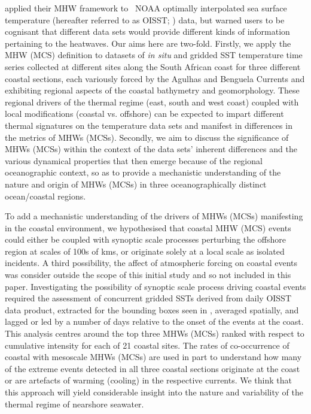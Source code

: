 \documentclass[a4paper,10pt,review]{elsarticle}
\begin{document}
\citet{Hobday2016} applied their MHW framework to \degree~NOAA optimally interpolated sea surface temperature (hereafter referred to as OISST; \cite{Reynolds2007}) data, but warned users to be cognisant that different data sets would provide different kinds of information pertaining to the heatwaves. Our aims here are two-fold. Firstly, we apply the MHW (MCS) definition to datasets of \emph{in situ} and gridded SST temperature time series collected at different sites along the South African coast for three different coastal sections, each variously forced by the Agulhas and Benguela Currents and exhibiting regional aspects of the coastal bathymetry and geomorphology. These regional drivers of the thermal regime (east, south and west coast) coupled with local modifications (coastal vs. offshore) can be expected to impart different thermal signatures on the temperature data sets and manifest in differences in the metrics of MHWs (MCSs). Secondly, we aim to discuss the significance of MHWs (MCSs) within the context of the data sets’ inherent differences and the various dynamical properties that then emerge because of the regional oceanographic context, so as to provide a mechanistic understanding of the nature and origin of MHWs (MCSs) in three oceanographically distinct ocean/coastal regions.

To add a mechanistic understanding of the drivers of MHWs (MCSs) manifesting in the coastal environment, we hypothesised that coastal MHW (MCS) events could either be coupled with synoptic scale processes perturbing the offshore region at scales of 100s of kms, or originate solely at a local scale as isolated incidents. A third possibility, the affect of atmospheric forcing on coastal events was consider outside the scope of this initial study and so not included in this paper. Investigating the possibility of synoptic scale process driving coastal events required the assessment of concurrent gridded SSTs derived from daily OISST data product, extracted for the bounding boxes seen in , averaged spatially, and lagged or led by a number of days relative to the onset of the events at the coast. This analysis centres around the top three MHWs (MCSs) ranked with respect to cumulative intensity for each of 21 coastal sites. The rates of co-occurrence of coastal with mesoscale MHWs (MCSs) are used in part to understand how many of the extreme events detected in all three coastal sections originate at the coast or are artefacts of warming (cooling) in the respective currents. We think that this approach will yield considerable insight into the nature and variability of the thermal regime of nearshore seawater.
\end{document}
